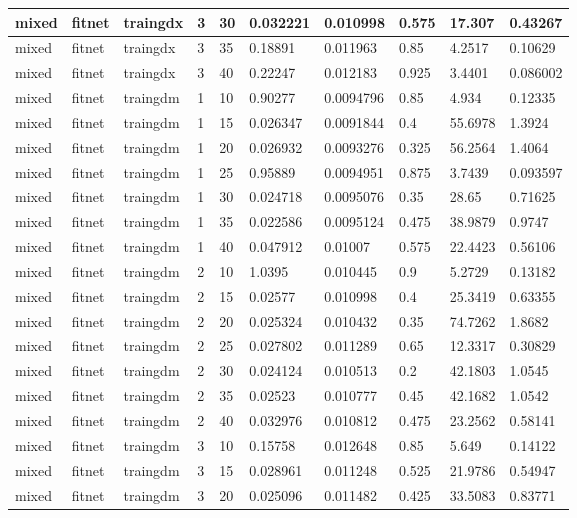 \begin{longtable}{lllllllll}
mixed & fitnet & traingdx & 3 & 30 & 0.032221 & 0.010998 & 0.575 & 17.307 & 0.43267 \\ \hline 
mixed & fitnet & traingdx & 3 & 35 & 0.18891 & 0.011963 & 0.85 & 4.2517 & 0.10629 \\ \hline 
mixed & fitnet & traingdx & 3 & 40 & 0.22247 & 0.012183 & 0.925 & 3.4401 & 0.086002 \\ \hline 
mixed & fitnet & traingdm & 1 & 10 & 0.90277 & 0.0094796 & 0.85 & 4.934 & 0.12335 \\ \hline 
mixed & fitnet & traingdm & 1 & 15 & 0.026347 & 0.0091844 & 0.4 & 55.6978 & 1.3924 \\ \hline 
mixed & fitnet & traingdm & 1 & 20 & 0.026932 & 0.0093276 & 0.325 & 56.2564 & 1.4064 \\ \hline 
mixed & fitnet & traingdm & 1 & 25 & 0.95889 & 0.0094951 & 0.875 & 3.7439 & 0.093597 \\ \hline 
mixed & fitnet & traingdm & 1 & 30 & 0.024718 & 0.0095076 & 0.35 & 28.65 & 0.71625 \\ \hline 
mixed & fitnet & traingdm & 1 & 35 & 0.022586 & 0.0095124 & 0.475 & 38.9879 & 0.9747 \\ \hline 
mixed & fitnet & traingdm & 1 & 40 & 0.047912 & 0.01007 & 0.575 & 22.4423 & 0.56106 \\ \hline 
mixed & fitnet & traingdm & 2 & 10 & 1.0395 & 0.010445 & 0.9 & 5.2729 & 0.13182 \\ \hline 
mixed & fitnet & traingdm & 2 & 15 & 0.02577 & 0.010998 & 0.4 & 25.3419 & 0.63355 \\ \hline 
mixed & fitnet & traingdm & 2 & 20 & 0.025324 & 0.010432 & 0.35 & 74.7262 & 1.8682 \\ \hline 
mixed & fitnet & traingdm & 2 & 25 & 0.027802 & 0.011289 & 0.65 & 12.3317 & 0.30829 \\ \hline 
mixed & fitnet & traingdm & 2 & 30 & 0.024124 & 0.010513 & 0.2 & 42.1803 & 1.0545 \\ \hline 
mixed & fitnet & traingdm & 2 & 35 & 0.02523 & 0.010777 & 0.45 & 42.1682 & 1.0542 \\ \hline 
mixed & fitnet & traingdm & 2 & 40 & 0.032976 & 0.010812 & 0.475 & 23.2562 & 0.58141 \\ \hline 
mixed & fitnet & traingdm & 3 & 10 & 0.15758 & 0.012648 & 0.85 & 5.649 & 0.14122 \\ \hline 
mixed & fitnet & traingdm & 3 & 15 & 0.028961 & 0.011248 & 0.525 & 21.9786 & 0.54947 \\ \hline 
mixed & fitnet & traingdm & 3 & 20 & 0.025096 & 0.011482 & 0.425 & 33.5083 & 0.83771 \\ \hline 

\end{longtable}
